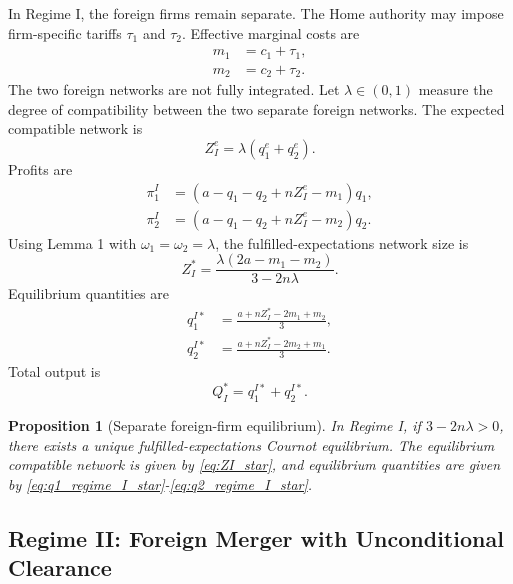 \documentclass[12pt]{article}
\newtheorem{proposition}{Proposition}
\begin{document}
In Regime I, the foreign firms remain separate. The Home authority may impose firm-specific tariffs $\tau_1$ and $\tau_2$. Effective marginal costs are
\begin{align}
m_1&=c_1+\tau_1,\label{eq:m1_regime_I}\\
m_2&=c_2+\tau_2.\label{eq:m2_regime_I}
\end{align}
The two foreign networks are not fully integrated. Let $\lambda\in(0,1)$ measure the degree of compatibility between the two separate foreign networks. The expected compatible network is
\begin{equation}
Z_I^e=\lambda(q_1^e+q_2^e).
\label{eq:network_regime_I}
\end{equation}
Profits are
\begin{align}
\pi_1^I&=(a-q_1-q_2+nZ_I^e-m_1)q_1,\label{eq:profit_1_regime_I}\\
\pi_2^I&=(a-q_1-q_2+nZ_I^e-m_2)q_2.\label{eq:profit_2_regime_I}
\end{align}
Using Lemma 1 with $\omega_1=\omega_2=\lambda$, the fulfilled-expectations network size is
\begin{equation}
Z_I^*=\frac{\lambda(2a-m_1-m_2)}{3-2n\lambda}.
\label{eq:ZI_star}
\end{equation}
Equilibrium quantities are
\begin{align}
q_1^{I*}&=\frac{a+nZ_I^*-2m_1+m_2}{3},\label{eq:q1_regime_I_star}\\
q_2^{I*}&=\frac{a+nZ_I^*-2m_2+m_1}{3}.\label{eq:q2_regime_I_star}
\end{align}
Total output is
\begin{equation}
Q_I^*=q_1^{I*}+q_2^{I*}.
\label{eq:QI_star}
\end{equation}

\begin{proposition}[Separate foreign-firm equilibrium]
In Regime I, if $3-2n\lambda>0$, there exists a unique fulfilled-expectations Cournot equilibrium. The equilibrium compatible network is given by \eqref{eq:ZI_star}, and equilibrium quantities are given by \eqref{eq:q1_regime_I_star}-\eqref{eq:q2_regime_I_star}.
\end{proposition}

\subsection{Regime II: Foreign Merger with Unconditional Clearance}
\end{document}
